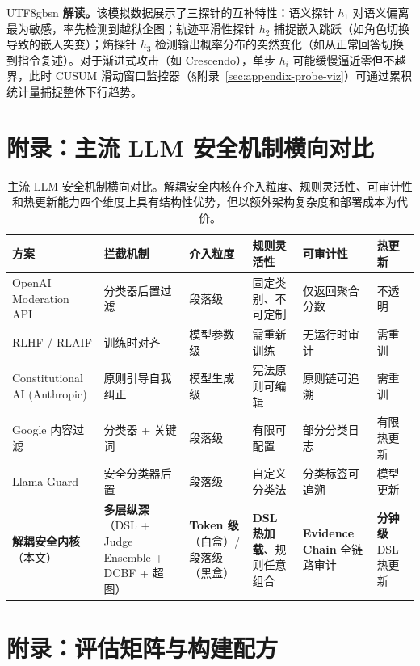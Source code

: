 \documentclass[letterpaper,twocolumn,10pt]{article}
\begin{document}
\begin{CJK}{UTF8}{gbsn}
\noindent\textbf{解读。}该模拟数据展示了三探针的互补特性：语义探针 $h_1$ 对语义偏离最为敏感，率先检测到越狱企图；轨迹平滑性探针 $h_2$ 捕捉嵌入跳跃（如角色切换导致的嵌入突变）；熵探针 $h_3$ 检测输出概率分布的突然变化（如从正常回答切换到指令复述）。对于渐进式攻击（如 Crescendo），单步 $h_i$ 可能缓慢逼近零但不越界，此时 CUSUM 滑动窗口监控器（\S 附录~\ref{sec:appendix-probe-viz}）可通过累积统计量捕捉整体下行趋势。

\section{附录：主流 LLM 安全机制横向对比}
\label{sec:appendix-comparison}

\begin{table}[t]
\centering
\small
\setlength{\tabcolsep}{3pt}
\begin{tabular}{@{}p{2.8cm}p{2.4cm}p{2.2cm}p{2.2cm}p{2.0cm}p{2.0cm}@{}}
\toprule
\textbf{方案} & \textbf{拦截机制} & \textbf{介入粒度} & \textbf{规则灵活性} & \textbf{可审计性} & \textbf{热更新} \\
\midrule
OpenAI Moderation API & 分类器后置过滤 & 段落级 & 固定类别、不可定制 & 仅返回聚合分数 & 不透明 \\
RLHF / RLAIF & 训练时对齐 & 模型参数级 & 需重新训练 & 无运行时审计 & 需重训 \\
Constitutional AI (Anthropic) & 原则引导自我纠正 & 模型生成级 & 宪法原则可编辑 & 原则链可追溯 & 需重训 \\
Google 内容过滤 & 分类器 + 关键词 & 段落级 & 有限可配置 & 部分分类日志 & 有限热更新 \\
Llama-Guard & 安全分类器后置 & 段落级 & 自定义分类法 & 分类标签可追溯 & 模型更新 \\
\textbf{解耦安全内核}（本文） & \textbf{多层纵深}（DSL + Judge Ensemble + DCBF + 超图） & \textbf{Token 级}（白盒）/ 段落级（黑盒） & \textbf{DSL 热加载}、规则任意组合 & \textbf{Evidence Chain} 全链路审计 & \textbf{分钟级} DSL 热更新 \\
\bottomrule
\end{tabular}
\caption{主流 LLM 安全机制横向对比。解耦安全内核在介入粒度、规则灵活性、可审计性和热更新能力四个维度上具有结构性优势，但以额外架构复杂度和部署成本为代价。}
\label{tab:safety-comparison}
\end{table}

\section{附录：评估矩阵与构建配方}
\label{sec:appendix-eval}


\end{CJK}
\end{document}
